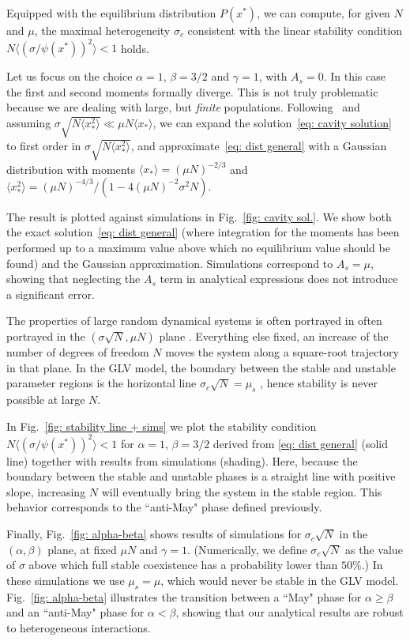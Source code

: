 Equipped with the equilibrium distribution $P(x^*)$, we can compute, for given $N$ and $\mu$, the maximal heterogeneity $\sigma_c$ consistent with the linear stability condition $N\langle (\sigma/\psi(x^*))^2\rangle < 1$ holds. 

Let us focus on the choice $\alpha=1$, $\beta=3/2$ and $\gamma=1$, with $A_s=0$.  
In this case the first and second moments formally diverge.
This is not truly problematic because we are dealing with large, but \emph{finite} populations.
Following~\cite{Cui2020,Hatton2023} and assuming $\sigma \sqrt{N\langle x_*^2\rangle}\ll \mu N \langle x_* \rangle$, we can expand the solution~\eqref{eq: cavity solution} to first order in $\sigma \sqrt{N\langle x_*^2\rangle}$, and approximate~\eqref{eq: dist general} with a Gaussian distribution with moments $\langle x_*\rangle=(\mu N)^{-2/3}$ and $\langle x_*^2\rangle=(\mu N)^{-4/3}/(1-4(\mu N)^{-2}\sigma^2N)$. 

The result is plotted against simulations in Fig.~\ref{fig: cavity sol.}. We show both the exact solution~\eqref{eq: dist general} (where integration for the moments has been performed up to a maximum value above which no equilibrium value should be found) and the Gaussian approximation. Simulations correspond to $A_s=\mu$, showing that neglecting the $A_s$ term in analytical expressions does not introduce a significant error. 


The properties of large random dynamical systems is often portrayed in often portrayed in the $(\sigma \sqrt{N},\mu N)$ plane \cite{bunin2017ecological}. Everything else fixed, an increase of the number of degrees of freedom $N$ moves the system along a square-root trajectory in that plane. In the GLV model, the boundary between the stable and unstable parameter regions is the horizontal line $\sigma_c\sqrt{N} = \mu_s$ \cite{bunin2017ecological}, hence stability is never possible at large $N$. 

In Fig.~\ref{fig: stability line + sims} we plot the stability condition $N\langle (\sigma/\psi(x^*))^2\rangle < 1$ for $\alpha = 1$, $\beta = 3/2$ derived from \eqref{eq: dist general} (solid line) together with results from simulations (shading). Here, because the boundary between the stable and unstable phases is a straight line with positive slope, increasing $N$ will eventually bring the system in the stable region. This behavior corresponds to the ``anti-May" phase defined previously. 








Finally, Fig.~\ref{fig: alpha-beta} shows results of simulations for $\sigma_c\sqrt{N}$ in the $(\alpha,\beta)$ plane, at fixed $\mu N$ and $\gamma = 1$. (Numerically, we define $\sigma_c\sqrt{N}$ as the value of $\sigma$ above which full stable coexistence has a probability lower than $50\%$.) In these simulations we use $\mu_s = \mu$, which would never be stable in the GLV model. Fig.~\ref{fig: alpha-beta} illustrates the transition between a ``May" phase for $\alpha \geq \beta$ and an ``anti-May" phase for $\alpha < \beta$, showing that our analytical results are robust to heterogeneous interactions.